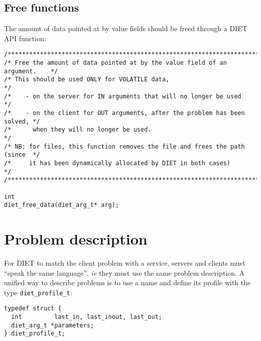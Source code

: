 \subsection{Free functions}
\label{sec:freefun}

The amount of data  pointed at by value fields should be freed through a DIET
API function:
{\footnotesize
\begin{verbatim}
/****************************************************************************/
/* Free the amount of data pointed at by the value field of an argument.    */
/* This should be used ONLY for VOLATILE data,                              */
/*    - on the server for IN arguments that will no longer be used          */
/*    - on the client for OUT arguments, after the problem has been solved, */
/*      when they will no longer be used.                                   */
/* NB: for files, this function removes the file and frees the path (since  */
/*     it has been dynamically allocated by DIET in both cases)             */
/****************************************************************************/

int
diet_free_data(diet_arg_t* arg);
\end{verbatim}
}


\section{Problem description}
\label{sec:pbdesc}

For DIET to match the client problem with a service, servers and clients must
``speak the same language'', \emph{ie} they must use the same problem
description. A unified way to describe problems is to use a name and define its
profile with the type \texttt{diet\_profile\_t}:
{\footnotesize
\begin{verbatim}
typedef struct {
  int         last_in, last_inout, last_out;
  diet_arg_t *parameters;
} diet_profile_t;
\end{verbatim}
}



